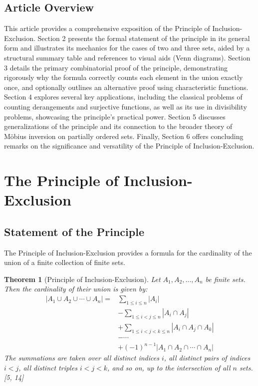 \documentclass[11pt]{amsart}
\theoremstyle{plain}
\newtheorem{theorem}{Theorem}[section]
\theoremstyle{definition}
\theoremstyle{remark}
\begin{document}
\subsection{Article Overview}
This article provides a comprehensive exposition of the Principle of Inclusion-Exclusion. Section 2 presents the formal statement of the principle in its general form and illustrates its mechanics for the cases of two and three sets, aided by a structural summary table and references to visual aids (Venn diagrams). Section 3 details the primary combinatorial proof of the principle, demonstrating rigorously why the formula correctly counts each element in the union exactly once, and optionally outlines an alternative proof using characteristic functions. Section 4 explores several key applications, including the classical problems of counting derangements and surjective functions, as well as its use in divisibility problems, showcasing the principle's practical power. Section 5 discusses generalizations of the principle and its connection to the broader theory of M\"obius inversion on partially ordered sets. Finally, Section 6 offers concluding remarks on the significance and versatility of the Principle of Inclusion-Exclusion.

\section{The Principle of Inclusion-Exclusion}

\subsection{Statement of the Principle}
The Principle of Inclusion-Exclusion provides a formula for the cardinality of the union of a finite collection of finite sets.

\begin{theorem}[Principle of Inclusion-Exclusion]
Let $A_1, A_2, \ldots, A_n$ be finite sets. Then the cardinality of their union is given by:
\begin{align*}
|A_1 \cup A_2 \cup \cdots \cup A_n| = &\sum_{1 \le i \le n} |A_i| \\
&- \sum_{1 \le i < j \le n} |A_i \cap A_j| \\
&+ \sum_{1 \le i < j < k \le n} |A_i \cap A_j \cap A_k| \\
&- \cdots \\
&+ (-1)^{n-1} |A_1 \cap A_2 \cap \cdots \cap A_n|
\label{eq:pie_expanded}
\end{align*}
The summations are taken over all distinct indices $i$, all distinct pairs of indices $i < j$, all distinct triples $i < j < k$, and so on, up to the intersection of all $n$ sets.[5, 14]
\end{theorem}
\end{document}
